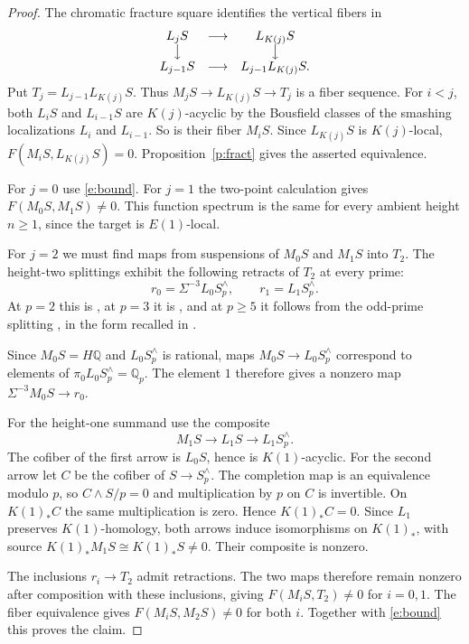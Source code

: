\documentclass[11pt,reqno]{amsart}
\theoremstyle{definition}
\numberwithin{equation}{section}
\begin{document}
\begin{proof}
The chromatic fracture square \cite{hs} identifies the vertical fibers in
\[
 \begin{matrix}
 L_jS&\longrightarrow&L_{K(j)}S\\
 \big\downarrow&&\big\downarrow\\
 L_{j-1}S&\longrightarrow&L_{j-1}L_{K(j)}S .
 \end{matrix}
\]
Put $T_j=L_{j-1}L_{K(j)}S$. Thus $M_jS\to L_{K(j)}S\to T_j$ is a fiber sequence. For $i<j$, both $L_iS$ and $L_{i-1}S$ are $K(j)$-acyclic by the Bousfield classes of the smashing localizations $L_i$ and $L_{i-1}$. So is their fiber $M_iS$. Since $L_{K(j)}S$ is $K(j)$-local, $F(M_iS,L_{K(j)}S)=0$. Proposition~\ref{p:fract} gives the asserted equivalence.

For $j=0$ use \eqref{e:bound}. For $j=1$ the two-point calculation \cite[Example~8.16]{bchs} gives $F(M_0S,M_1S)\ne0$. This function spectrum is the same for every ambient height $n\ge1$, since the target is $E(1)$-local.

For $j=2$ we must find maps from suspensions of $M_0S$ and $M_1S$ into $T_2$. The height-two splittings exhibit the following retracts of $T_2$ at every prime:
\[
 r_0=\Sigma^{-3}L_0S_p^\wedge,\qquad r_1=L_1S_p^\wedge.
\]
At $p=2$ this is \cite[Theorem~2]{bgh}, at $p=3$ it is \cite[Theorem~5.11]{ghm}, and at $p\ge5$ it follows from the odd-prime splitting \cite{sy}, in the form recalled in \cite[\S1, after Conjecture~5]{bgh}.

Since $M_0S=H\mathbb Q$ and $L_0S_p^\wedge$ is rational, maps $M_0S\to L_0S_p^\wedge$ correspond to elements of $\pi_0 L_0S_p^\wedge=\mathbb Q_p$. The element $1$ therefore gives a nonzero map $\Sigma^{-3}M_0S\to r_0$.

For the height-one summand use the composite
\[
 M_1S\longrightarrow L_1S\longrightarrow L_1S_p^\wedge .
\]
The cofiber of the first arrow is $L_0S$, hence is $K(1)$-acyclic. For the second arrow let $C$ be the cofiber of $S\to S_p^\wedge$. The completion map is an equivalence modulo $p$, so $C\wedge S/p=0$ and multiplication by $p$ on $C$ is invertible. On $K(1)_*C$ the same multiplication is zero. Hence $K(1)_*C=0$. Since $L_1$ preserves $K(1)$-homology, both arrows induce isomorphisms on $K(1)_*$, with source $K(1)_*M_1S\cong K(1)_*S\ne0$. Their composite is nonzero.

The inclusions $r_i\to T_2$ admit retractions. The two maps therefore remain nonzero after composition with these inclusions, giving $F(M_iS,T_2)\ne0$ for $i=0,1$. The fiber equivalence gives $F(M_iS,M_2S)\ne0$ for both $i$. Together with \eqref{e:bound} this proves the claim.
\end{proof}
\end{document}
